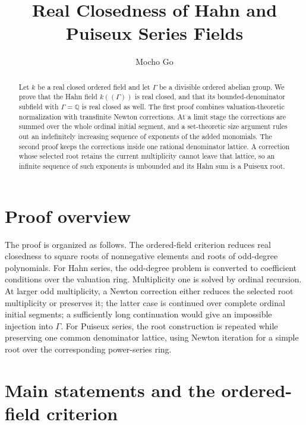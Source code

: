 \documentclass[11pt]{article}
\title{Real Closedness of Hahn and Puiseux Series Fields}
\author{Mocho Go}
\date{}
\theoremstyle{proofnote}
\begin{document}
\maketitle

\begin{abstract}
  Let \(k\) be a real closed ordered field and let \(\Gamma\) be a divisible
  ordered abelian group.  We prove that the Hahn field \(k((\Gamma))\) is
  real closed, and that its bounded-denominator subfield with
  \(\Gamma=\mathbb Q\) is real closed as well.  The first proof combines
  valuation-theoretic normalization with transfinite Newton corrections.  At
  a limit stage the corrections are summed over the whole ordinal initial
  segment, and a set-theoretic size argument rules out an indefinitely
  increasing sequence of exponents of the added monomials.  The second proof
  keeps the corrections inside one rational
  denominator lattice.  A correction whose selected root retains the current
  multiplicity cannot leave that lattice,
  so an infinite sequence of such exponents is unbounded and its Hahn sum is
  a Puiseux root.
\end{abstract}

\tableofcontents

\section*{Proof overview}

The proof is organized as follows.  The ordered-field criterion reduces
real closedness to square roots of nonnegative elements and roots of
odd-degree polynomials.  For Hahn series, the odd-degree problem is converted
to coefficient conditions over the valuation ring.  Multiplicity one is
solved by ordinal recursion.  At larger odd multiplicity, a Newton correction
either reduces the selected root multiplicity or preserves it; the latter
case is continued over complete ordinal initial segments; a sufficiently long
continuation would give an impossible injection into \(\Gamma\).  For
Puiseux series, the root construction is repeated while preserving one common
denominator lattice, using Newton iteration for a simple root over the
corresponding power-series ring.

\section{Main statements and the ordered-field criterion}
\label{sec:main}
\end{document}
